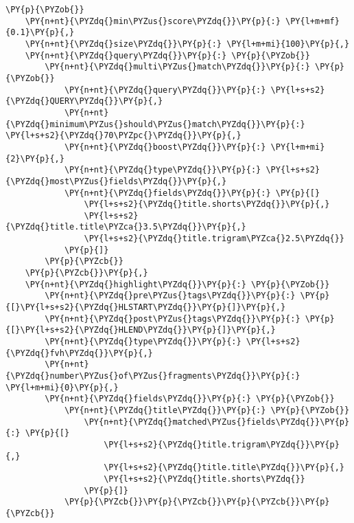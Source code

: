 \begin{Verbatim}[commandchars=\\\{\}]
\PY{p}{\PYZob{}}
    \PY{n+nt}{\PYZdq{}min\PYZus{}score\PYZdq{}}\PY{p}{:} \PY{l+m+mf}{0.1}\PY{p}{,}
    \PY{n+nt}{\PYZdq{}size\PYZdq{}}\PY{p}{:} \PY{l+m+mi}{100}\PY{p}{,}
    \PY{n+nt}{\PYZdq{}query\PYZdq{}}\PY{p}{:} \PY{p}{\PYZob{}}
        \PY{n+nt}{\PYZdq{}multi\PYZus{}match\PYZdq{}}\PY{p}{:} \PY{p}{\PYZob{}}
            \PY{n+nt}{\PYZdq{}query\PYZdq{}}\PY{p}{:} \PY{l+s+s2}{\PYZdq{}QUERY\PYZdq{}}\PY{p}{,}
            \PY{n+nt}{\PYZdq{}minimum\PYZus{}should\PYZus{}match\PYZdq{}}\PY{p}{:} \PY{l+s+s2}{\PYZdq{}70\PYZpc{}\PYZdq{}}\PY{p}{,}
            \PY{n+nt}{\PYZdq{}boost\PYZdq{}}\PY{p}{:} \PY{l+m+mi}{2}\PY{p}{,}
            \PY{n+nt}{\PYZdq{}type\PYZdq{}}\PY{p}{:} \PY{l+s+s2}{\PYZdq{}most\PYZus{}fields\PYZdq{}}\PY{p}{,}
            \PY{n+nt}{\PYZdq{}fields\PYZdq{}}\PY{p}{:} \PY{p}{[}
                \PY{l+s+s2}{\PYZdq{}title.shorts\PYZdq{}}\PY{p}{,}
                \PY{l+s+s2}{\PYZdq{}title.title\PYZca{}3.5\PYZdq{}}\PY{p}{,}
                \PY{l+s+s2}{\PYZdq{}title.trigram\PYZca{}2.5\PYZdq{}}
            \PY{p}{]}
        \PY{p}{\PYZcb{}}
    \PY{p}{\PYZcb{}}\PY{p}{,}
    \PY{n+nt}{\PYZdq{}highlight\PYZdq{}}\PY{p}{:} \PY{p}{\PYZob{}}
        \PY{n+nt}{\PYZdq{}pre\PYZus{}tags\PYZdq{}}\PY{p}{:} \PY{p}{[}\PY{l+s+s2}{\PYZdq{}HLSTART\PYZdq{}}\PY{p}{]}\PY{p}{,}
        \PY{n+nt}{\PYZdq{}post\PYZus{}tags\PYZdq{}}\PY{p}{:} \PY{p}{[}\PY{l+s+s2}{\PYZdq{}HLEND\PYZdq{}}\PY{p}{]}\PY{p}{,}
        \PY{n+nt}{\PYZdq{}type\PYZdq{}}\PY{p}{:} \PY{l+s+s2}{\PYZdq{}fvh\PYZdq{}}\PY{p}{,}
        \PY{n+nt}{\PYZdq{}number\PYZus{}of\PYZus{}fragments\PYZdq{}}\PY{p}{:} \PY{l+m+mi}{0}\PY{p}{,}
        \PY{n+nt}{\PYZdq{}fields\PYZdq{}}\PY{p}{:} \PY{p}{\PYZob{}}
            \PY{n+nt}{\PYZdq{}title\PYZdq{}}\PY{p}{:} \PY{p}{\PYZob{}}
                \PY{n+nt}{\PYZdq{}matched\PYZus{}fields\PYZdq{}}\PY{p}{:} \PY{p}{[}
                    \PY{l+s+s2}{\PYZdq{}title.trigram\PYZdq{}}\PY{p}{,}
                    \PY{l+s+s2}{\PYZdq{}title.title\PYZdq{}}\PY{p}{,}
                    \PY{l+s+s2}{\PYZdq{}title.shorts\PYZdq{}}
                \PY{p}{]}
            \PY{p}{\PYZcb{}}\PY{p}{\PYZcb{}}\PY{p}{\PYZcb{}}\PY{p}{\PYZcb{}}
\end{Verbatim}
